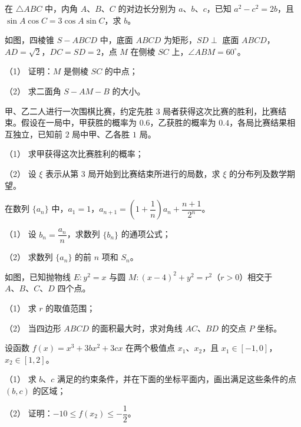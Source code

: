 \begin{question}
在 $\triangle ABC$ 中，内角 $A\text{、}B\text{、}C$ 的对边长分别为 $a\text{、}b\text{、}c$，已知 $a^2-c^2=2b$，且 $\sin A\cos C=3\cos A\sin C$，求 $b$。

\Needspace{0.4\textheight}
\end{question}
\begin{question}
如图，四棱锥 $S-ABCD$ 中，底面 $ABCD$ 为矩形，$SD\perp$ 底面 $ABCD$，$AD=\sqrt2$，$DC=SD=2$，点 $M$ 在侧棱 $SC$ 上，$\angle ABM=60^\circ$。
\nopagebreak[4]
\begin{center}\end{center}
\nopagebreak[4]
（1） 证明：$M$ 是侧棱 $SC$ 的中点；

（2） 求二面角 $S-AM-B$ 的大小。

\end{question}
\begin{question}
甲、乙二人进行一次围棋比赛，约定先胜 $3$ 局者获得这次比赛的胜利，比赛结束。假设在一局中，甲获胜的概率为 $0.6$，乙获胜的概率为 $0.4$，各局比赛结果相互独立，已知前 $2$ 局中甲、乙各胜 $1$ 局。

（1） 求甲获得这次比赛胜利的概率；

（2） 设 $\xi$ 表示从第 $3$ 局开始到比赛结束所进行的局数，求 $\xi$ 的分布列及数学期望。

\end{question}
\begin{question}
在数列 $\{a_n\}$ 中，$a_1=1$，$a_{n+1}=\left(1+\dfrac1n\right)a_n+\dfrac{n+1}{2^n}$。

（1） 设 $b_n=\dfrac{a_n}{n}$，求数列 $\{b_n\}$ 的通项公式；

（2） 求数列 $\{a_n\}$ 的前 $n$ 项和 $S_n$。

\Needspace{0.4\textheight}
\end{question}
\begin{question}
如图，已知抛物线 $E:y^2=x$ 与圆 $M:(x-4)^2+y^2=r^2$（$r>0$）相交于 $A\text{、}B\text{、}C\text{、}D$ 四个点。
\nopagebreak[4]
\begin{center}\end{center}
\nopagebreak[4]
（1） 求 $r$ 的取值范围；

（2） 当四边形 $ABCD$ 的面积最大时，求对角线 $AC\text{、}BD$ 的交点 $P$ 坐标。

\Needspace{0.4\textheight}
\end{question}
\begin{question}
设函数 $f(x)=x^3+3bx^2+3cx$ 在两个极值点 $x_1\text{、}x_2$，且 $x_1\in[-1,0]$，$x_2\in[1,2]$。
\nopagebreak[4]
\begin{center}\end{center}
\nopagebreak[4]
（1） 求 $b\text{、}c$ 满足的约束条件，并在下面的坐标平面内，画出满足这些条件的点 $(b,c)$ 的区域；

（2） 证明：$-10\leqslant f(x_2)\leqslant-\dfrac12$。

\end{question}